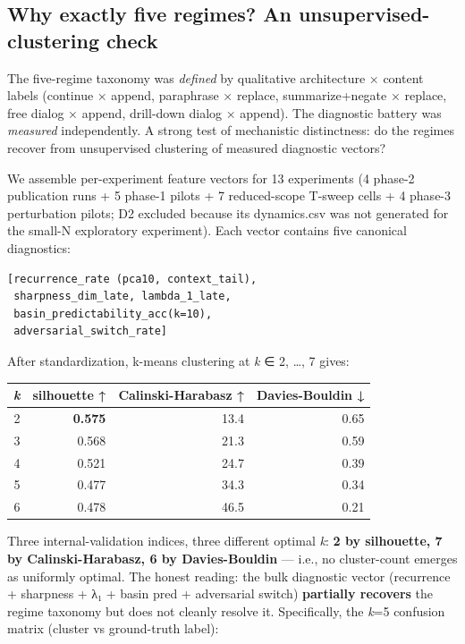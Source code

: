 \documentclass{article}
\theoremstyle{plain}
\theoremstyle{definition}
\begin{document}
\subsection{Why exactly five regimes? An unsupervised-clustering check}

The five-regime taxonomy was \textit{defined} by qualitative architecture ×
content labels (continue × append, paraphrase × replace,
summarize+negate × replace, free dialog × append, drill-down dialog
× append). The diagnostic battery was \textit{measured} independently. A
strong test of mechanistic distinctness: do the regimes recover from
unsupervised clustering of measured diagnostic vectors?

We assemble per-experiment feature vectors for 13 experiments
(4 phase-2 publication runs + 5 phase-1 pilots + 7 reduced-scope
T-sweep cells + 4 phase-3 perturbation pilots; D2 excluded because
its dynamics.csv was not generated for the small-N exploratory
experiment). Each vector contains five canonical diagnostics:

\begin{verbatim}
[recurrence_rate (pca10, context_tail),
 sharpness_dim_late, lambda_1_late,
 basin_predictability_acc(k=10),
 adversarial_switch_rate]
\end{verbatim}

After standardization, k-means clustering at \textit{k} ∈ {2, …, 7} gives:

\begin{table}[h!]
\centering
\small
\begin{tabular}{rrrr}
\toprule
\textit{k} & silhouette ↑ & Calinski-Harabasz ↑ & Davies-Bouldin ↓ \\
\midrule
2 & \textbf{0.575} & 13.4 & 0.65 \\
3 & 0.568 & 21.3 & 0.59 \\
4 & 0.521 & 24.7 & 0.39 \\
5 & 0.477 & 34.3 & 0.34 \\
6 & 0.478 & 46.5 & 0.21 \\
\bottomrule
\end{tabular}
\end{table}

Three internal-validation indices, three different optimal \textit{k}: \textbf{2
by silhouette, 7 by Calinski-Harabasz, 6 by Davies-Bouldin} — i.e.,
no cluster-count emerges as uniformly optimal. The honest reading:
the bulk diagnostic vector (recurrence + sharpness + λ₁ + basin pred
+ adversarial switch) \textbf{partially recovers} the regime taxonomy but
does not cleanly resolve it. Specifically, the \textit{k}=5 confusion
matrix (cluster vs ground-truth label):
\end{document}
